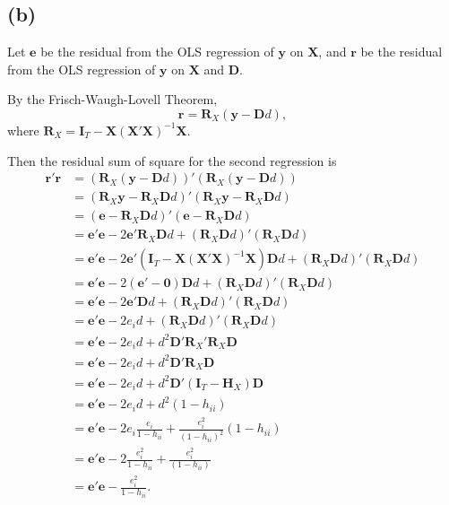 \documentclass[
]{article}
\begin{document}
\hypertarget{b}{%
\subsection{(b)}\label{b}}

Let \(\boldsymbol{e}\) be the residual from the OLS regression of
\(\boldsymbol{y}\) on \(\boldsymbol{X}\), and \(\boldsymbol{r}\) be the
residual from the OLS regression of \(\boldsymbol{y}\) on
\(\boldsymbol{X}\) and \(\boldsymbol{D}\).

By the Frisch-Waugh-Lovell Theorem,
\[\boldsymbol{r} = \boldsymbol{R}_X(\boldsymbol{y}-\boldsymbol{D}d),\]
where
\(\boldsymbol{R}_X = \boldsymbol{I}_T-\boldsymbol{X}(\boldsymbol{X}'\boldsymbol{X})^{-1}\boldsymbol{X}\).

Then the residual sum of square for the second regression is
\begin{align*}
\boldsymbol{r}'\boldsymbol{r} &= (\boldsymbol{R}_X(\boldsymbol{y}-\boldsymbol{D}d))'(\boldsymbol{R}_X(\boldsymbol{y}-\boldsymbol{D}d)) \\
&= (\boldsymbol{R}_X\boldsymbol{y}-\boldsymbol{R}_X\boldsymbol{D}d)'(\boldsymbol{R}_X\boldsymbol{y}-\boldsymbol{R}_X\boldsymbol{D}d) \\
&= (\boldsymbol{e}-\boldsymbol{R}_X\boldsymbol{D}d)'(\boldsymbol{e}-\boldsymbol{R}_X\boldsymbol{D}d) \\
&= \boldsymbol{e}'\boldsymbol{e}-2\boldsymbol{e}'\boldsymbol{R}_X\boldsymbol{D}d+(\boldsymbol{R}_X\boldsymbol{D}d)'(\boldsymbol{R}_X\boldsymbol{D}d) \\
&= \boldsymbol{e}'\boldsymbol{e}-2\boldsymbol{e}'(\boldsymbol{I}_T-\boldsymbol{X}(\boldsymbol{X}'\boldsymbol{X})^{-1}\boldsymbol{X})\boldsymbol{D}d+(\boldsymbol{R}_X\boldsymbol{D}d)'(\boldsymbol{R}_X\boldsymbol{D}d) \\
&= \boldsymbol{e}'\boldsymbol{e}-2(\boldsymbol{e}'-\boldsymbol{0})\boldsymbol{D}d+(\boldsymbol{R}_X\boldsymbol{D}d)'(\boldsymbol{R}_X\boldsymbol{D}d) \\
&= \boldsymbol{e}'\boldsymbol{e}-2\boldsymbol{e}'\boldsymbol{D}d+(\boldsymbol{R}_X\boldsymbol{D}d)'(\boldsymbol{R}_X\boldsymbol{D}d) \\
&= \boldsymbol{e}'\boldsymbol{e}-2e_id+(\boldsymbol{R}_X\boldsymbol{D}d)'(\boldsymbol{R}_X\boldsymbol{D}d) \\
&= \boldsymbol{e}'\boldsymbol{e}-2e_id+d^2\boldsymbol{D}'\boldsymbol{R}_X'\boldsymbol{R}_X\boldsymbol{D} \\
&= \boldsymbol{e}'\boldsymbol{e}-2e_id+d^2\boldsymbol{D}'\boldsymbol{R}_X\boldsymbol{D} \\
&= \boldsymbol{e}'\boldsymbol{e}-2e_id+d^2\boldsymbol{D}'(\boldsymbol{I}_T-\boldsymbol{H}_X)\boldsymbol{D} \\
&= \boldsymbol{e}'\boldsymbol{e}-2e_id+d^2(1-h_{ii}) \\
&= \boldsymbol{e}'\boldsymbol{e}-2e_i\frac{e_i}{1-h_{ii}}+\frac{e_i^2}{(1-h_{ii})^2}(1-h_{ii}) \\
&= \boldsymbol{e}'\boldsymbol{e}-2\frac{e_i^2}{1-h_{ii}}+\frac{e_i^2}{(1-h_{ii})} \\
&= \boldsymbol{e}'\boldsymbol{e}-\frac{e_i^2}{1-h_{ii}}. \\
\end{align*}
\end{document}
